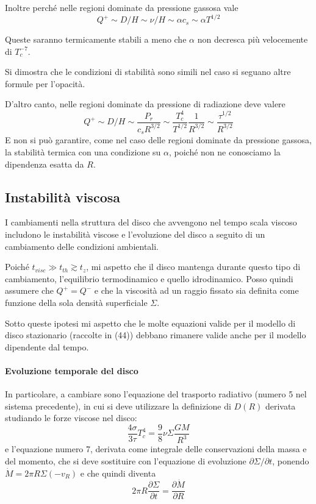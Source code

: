 \documentclass[a4paperbi]{article}
\begin{document}
	Inoltre perché nelle regioni dominate da pressione gassosa vale
	\begin{equation}
		Q^+\sim D/H\sim \nu/H\sim\alpha c_s\sim\alpha T^{1/2}
	\end{equation}		
	
	Queste saranno termicamente stabili a meno che $\alpha$ non decresca più velocemente di $T_c^{-7}$.
	
	Si dimostra che le condizioni di stabilità sono simili nel caso si seguano altre formule per l'opacità.
	
	D'altro canto, nelle regioni dominate da pressione di radiazione deve valere 
	\begin{equation}
		Q^+\sim D/H\sim \frac{P_r}{c_sR^{3/2}}\sim\frac{T_c^4}{T^{1/2}}\frac{1}{R^{3/2}}\sim\frac{\tau^{1/2}}{R^{3/2}}
	\end{equation}
	E non si può garantire, come nel caso delle regioni dominate da pressione gassosa, la stabilità termica con una condizione su $\alpha$, poiché non ne conosciamo la dipendenza esatta da $R$.

\subsection{Instabilità viscosa}
	I cambiamenti nella struttura del disco che avvengono nel tempo scala viscoso includono le instabilità viscose e l'evoluzione del disco a seguito di un cambiamento delle condizioni ambientali.
	
	Poiché $t_{visc}\gg t_{th}\gtrsim t_z$, mi aspetto che il disco mantenga durante questo tipo di cambiamento, l'equilibrio termodinamico e quello idrodinamico. Posso quindi assumere che $Q^+=Q^-$ e che la viscosità ad un raggio fissato sia definita come funzione della sola densità superficiale $\Sigma$. 
	
	Sotto queste ipotesi mi aspetto che le molte equazioni valide per il modello di disco stazionario (raccolte in (44))  debbano rimanere valide anche per il modello dipendente dal tempo. 
	
	\paragraph{Evoluzione temporale del disco}
	In particolare, a cambiare sono l'equazione del trasporto radiativo (numero 5 nel sistema precedente), in cui si deve utilizzare la definizione di $D(R)$ derivata studiando le forze viscose nel disco:
	\begin{equation}
		\frac{4\sigma}{3\tau}T_c^4=\frac{9}{8}\nu\Sigma\frac{GM}{R^3}
	\end{equation}
	e l'equazione numero 7, derivata come integrale delle conservazioni della massa e del momento, che si deve sostituire con l'equazione di evoluzione $\partial \Sigma/\partial t$, ponendo $\dot{M}=2\pi R\Sigma(-v_R)$ e che quindi diventa
	\begin{equation}
		2\pi R\frac{\partial \Sigma}{\partial t}=\frac{\partial\dot{M}}{\partial R}
	\end{equation}
	
\end{document}
